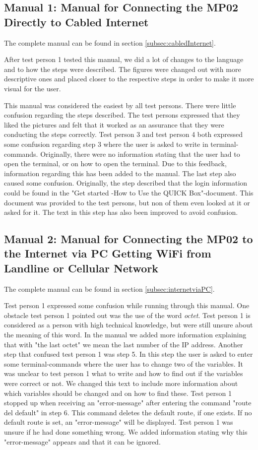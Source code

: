 \subsection{Manual 1: Manual for Connecting the MP02 Directly to Cabled Internet}
The complete manual can be found in section \ref{subsec:cabledInternet}.

After test person 1 tested this manual, we did a lot of changes to the language and to how the steps were described. The figures were changed out with more descriptive ones and placed closer to the respective steps in order to make it more visual for the user. 

This manual was considered the easiest by all test persons. There were little confusion regarding the steps described. The test persons expressed that they liked the pictures and felt that it worked as an assurance that they were conducting the steps correctly. Test person 3 and test person 4 both expressed some confusion regarding step 3 where the user is asked to write in terminal-commands. Originally, there were no information stating that the user had to open the terminal, or on how to open the terminal. Due to this feedback, information regarding this has been added to the manual. The last step also caused some confusion. Originally, the step described that the login information could be found in the "Get started -How to Use the QUICK Box"-document. This document was provided to the test persons, but non of them even looked at it or asked for it. The text in this step has also been improved to avoid confusion. 

\subsection{Manual 2: Manual for Connecting the MP02 to the Internet via PC Getting WiFi from Landline or Cellular Network}
The complete manual can be found in section \ref{subsec:internetviaPC}.

Test person 1 expressed some confusion while running through this manual. One obstacle test person 1 pointed out was the use of the word \textit{octet}. Test person 1 is considered as a person with high technical knowledge, but were still unsure about the meaning of this word. In the manual we added more information explaining that with "the last octet" we mean the last number of the IP address. Another step that confused test person 1 was step 5. In this step the user is asked to enter some terminal-commands where the user has to change two of the variables. It was unclear to test person 1 what to write and how to find out if the variables were correct or not. We changed this text to include more information about which variables should be changed and on how to find these. Test person 1 stopped up when receiving an "error-message" after entering the command "route del default" in step 6. This command deletes the default route, if one exists. If no default route is set, an "error-message" will be displayed. Test person 1 was unsure if he had done something wrong. We added information stating why this "error-message" appears and that it can be ignored. 

